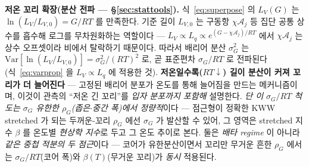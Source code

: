 \documentclass[11pt,a4paper]{article}
\begin{document}
\textbf{저온 꼬리 확장(분산 전파 — \S\ref{sec:stattools}).} 식~\eqref{eq:superpose} 의 $L_V(G)$ 는
$\ln(L_V/L_{V,0})=G/RT$ 를 만족한다. 기준 길이 $L_{V,0}$ 는 구동항 $\chi\mathcal A_j$ 등 집단 공통 상수를 흡수해
로그를 무차원화하는 역할이다 — $L_V\propto L_q\propto e^{(G-\chi\mathcal A_j)/RT}$ 에서 $\chi\mathcal A_j$ 는
상수 오프셋이라 비에서 탈락하기 때문이다. 따라서 배리어 분산 $\sigma_G^2$ 는
$\mathrm{Var}[\ln(L_V/L_{V,0})]=\sigma_G^2/(RT)^2$ 로, 곧 표준편차 $\sigma_G/RT$ 로 전파된다
(식~\eqref{eq:varprop} 을 $L_V\propto L_q$ 에 적용한 것). \textbf{저온일수록($RT\downarrow$) 길이 분산이 커져 꼬리가 더 늘어진다} — 고정된
배리어 분포가 온도를 통해 늘어짐을 만드는 메커니즘이며, 이것이 관측의 ``저온 긴 꼬리''를 \emph{입자 분포까지
포함해} 설명한다. \emph{단 이 $\sigma_G/RT$ 척도는 $\sigma_G$ 유한한 $\rho_G$(좁은$\cdot$중간 폭)에서 정량적}이다 —
점근형이 정확한 KWW stretched 가 되는 두꺼운-꼬리 $\rho_G$ 에선 $\sigma_G$ 가 발산할 수 있어, 그 영역은 stretched
지수 $\beta$ 를 온도별 \emph{현상학 지수}로 두고 그 온도 추이로 본다. 둘은 \emph{배타 regime} 이 아니라 \emph{같은 중첩 적분의 두 점근}이다 —
코어가 유한분산이면서 꼬리만 무거운 흔한 $\rho_G$ 에서는 $\sigma_G/RT$(코어 폭)와 $\beta(T)$(무거운 꼬리)가 \emph{동시}
적용된다.
\end{document}
